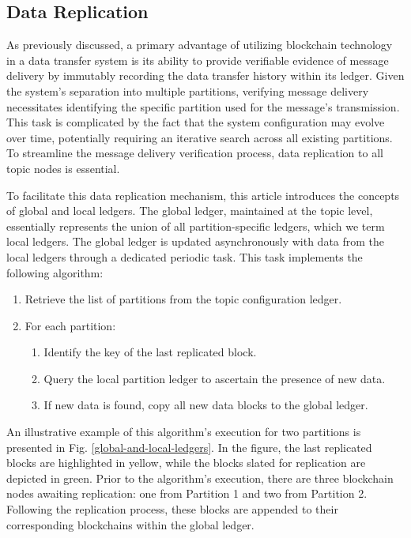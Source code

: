 \documentclass[10pt]{llncs}
\begin{document}
\subsection{Data Replication}\label{data-replication}
As previously discussed, a primary advantage of utilizing blockchain technology in a data transfer system is its ability to provide verifiable evidence of message delivery by immutably recording the data transfer history within its ledger.
 Given the system's separation into multiple partitions, verifying message delivery necessitates identifying the specific partition used for the message's transmission. 
 This task is complicated by the fact that the system configuration may evolve over time, potentially requiring an iterative search across all existing partitions.
 To streamline the message delivery verification process, data replication to all topic nodes is essential.

To facilitate this data replication mechanism, this article introduces the concepts of global and local ledgers. 
The global ledger, maintained at the topic level, essentially represents the union of all partition-specific ledgers, which we term local ledgers. 
The global ledger is updated asynchronously with data from the local ledgers through a dedicated periodic task. 
This task implements the following algorithm:

\begin{enumerate}
    \item Retrieve the list of partitions from the topic configuration ledger.
    \item For each partition:
    \begin{enumerate}
        \item Identify the key of the last replicated block.
        \item Query the local partition ledger to ascertain the presence of new data.
        \item If new data is found, copy all new data blocks to the global ledger.
    \end{enumerate}
\end{enumerate}

An illustrative example of this algorithm's execution for two partitions is presented in Fig. \ref{global-and-local-ledgers}. 
In the figure, the last replicated blocks are highlighted in yellow, while the blocks slated for replication are depicted in green. 
Prior to the algorithm's execution, there are three blockchain nodes awaiting replication: one from Partition 1 and two from Partition 2. 
Following the replication process, these blocks are appended to their corresponding blockchains within the global ledger.
\end{document}
